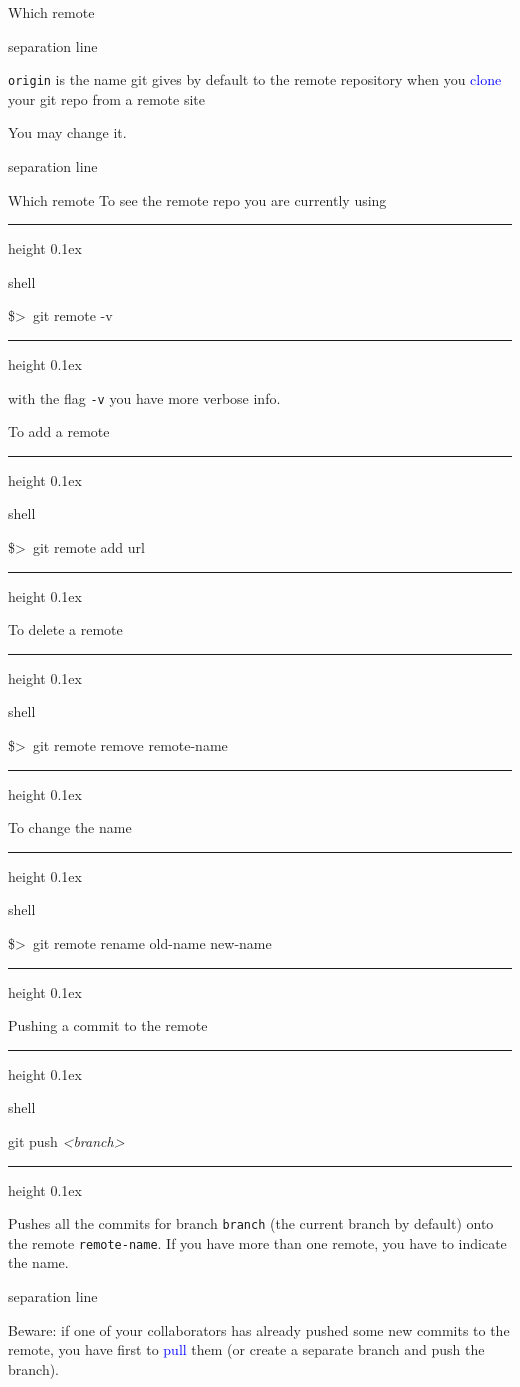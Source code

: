 \documentclass[hyperref={colorlinks}]{beamer}
\newenvironment{shell}{%
\footnotesize\flushleft\hrule height 0.1ex
\tt\begin{beamercolorbox}[sep=1ex,left]{shell}%
}{%
\end{beamercolorbox}
\hrule height 0.1ex
\endflushleft\par
}
\newcommand*{\psone}[1][ant]{\$>~}
\newcommand*{\var}[1]{{\it<#1>}}
\newcommand{\titleline}[1][0.025cm]{%
\begin{beamercolorbox}[wd=\paperwidth,ht=#1,center]{separation line}%
\end{beamercolorbox}%
}
\begin{document}
\begin{frame}{Which remote}
  \titleline
  \alert{\texttt{origin}} is the name git gives by default
  to the remote repository when you \textcolor{blue}{clone}
  your git repo from a remote site
    \medskip
 
    You may change it.
  \titleline
\end{frame}


\begin{frame}{Which remote}
To see the remote repo you are currently using
\begin{shell}
\psone git remote -v 
\end{shell}
with the flag \texttt{-v} you have more verbose info. 
\smallskip

To add a remote
\begin{shell}
\psone git remote add \var{remote-name} url
\end{shell}
To delete a remote
\begin{shell}
\psone git remote remove remote-name
\end{shell}
To change the name
\begin{shell}
\psone git remote rename old-name new-name
\end{shell}
\end{frame}

\begin{frame}{Pushing a commit to the remote}
\begin{shell}
git push \var{remote-name} \var{branch}
\end{shell}
Pushes all the commits for branch \texttt{branch} (the current branch by default) onto the remote \texttt{remote-name}. If you have more than one remote, you have to indicate the name.
\titleline
\medskip

Beware: if one of your collaborators has already pushed some new commits to the remote, you have first to \textcolor{blue}{pull} them (or create a separate branch and push the branch).
\end{frame}
\end{document}
